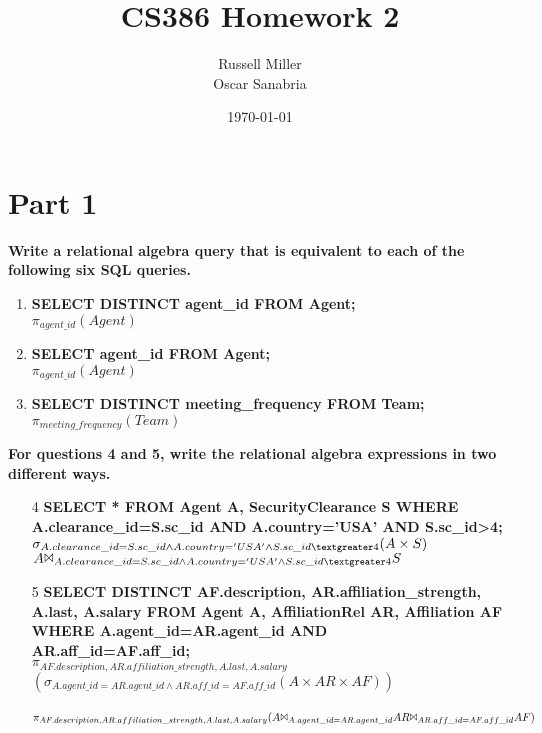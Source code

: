 \documentclass{article}
\title{CS386 Homework 2}
\author{Russell Miller\\
Oscar Sanabria}
\date{\today}
\begin{document}
\maketitle

\section*{Part 1}
\textbf{Write a relational algebra query that is equivalent to each of the following six SQL queries.\\}
\begin{enumerate}

\item
\textbf{SELECT DISTINCT agent\_id FROM Agent;\\}
$\pi_{agent\_id}(Agent)$\\

\item
\textbf{SELECT agent\_id FROM Agent;\\}
$\pi_{agent\_id}(Agent)$\\

\item
\textbf{SELECT DISTINCT meeting\_frequency FROM Team;\\}
$\pi_{meeting\_frequency}(Team)$\\

\end{enumerate}

\textbf{For questions 4 and 5, write the relational algebra expressions in two different ways.\\}
\begin{enumerate}

\item[4]
\textbf{SELECT * FROM Agent A, SecurityClearance S WHERE A.clearance\_id=S.sc\_id AND A.country='USA' AND S.sc\_id\textgreater4;\\}
$\sigma_{A.clearance\_id=S.sc\_id \wedge A.country='USA' \wedge S.sc\_id\textgreater4}(A \times S)$\\
$A \Bowtie_{A.clearance\_id=S.sc\_id \wedge A.country='USA' \wedge S.sc\_id\textgreater4} S$\\

\item[5]
\textbf{SELECT DISTINCT AF.description, AR.affiliation\_strength, A.last, A.salary FROM Agent A, AffiliationRel AR, 
Affiliation AF WHERE A.agent\_id=AR.agent\_id AND\\ AR.aff\_id=AF.aff\_id;\\}
$\pi_{AF.description,AR.affiliation\_strength,A.last,A.salary}$\\
$(\sigma_{A.agent\_id=AR.agent\_id \wedge AR.aff\_id=AF.aff\_id}(A \times AR \times AF))$\\
\\
$\pi_{AF.description,AR.affiliation\_strength,A.last,A.salary}(A \Bowtie_{A.agent\_id=AR.agent\_id} AR 
\Bowtie_{AR.aff\_id=AF.aff\_id} AF)$\\

\end{enumerate}
\end{document}
